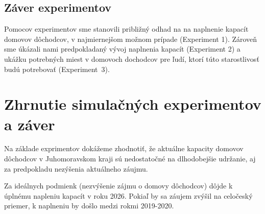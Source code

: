 \documentclass[a4paper, 11pt]{article}
\begin{document}
\subsection{Záver experimentov}
Pomocov experimentov sme stanovili približný odhad na na naplnenie kapacít domovov dôchodcov, v najmiernejšom možnom prípade (Experiment 1). Zároveň sme úkázali nami predpokladaný vývoj naplnenia kapacít (Experiment 2) a ukážku potrebných miest v domovoch dochodcov pre ľudí, ktorí túto starostlivosť budú potrebovať (Experiment~3).

\section{Zhrnutie simulačných experimentov a záver}
Na základe exprimentov dokážeme zhodnotiť, že aktuálne kapacity domovov dôchodcov v Juhomoravskom kraji sú nedostatočné na dlhodobejšie udržanie, aj za predpokladu nezýšenia aktuálneho záujmu.

Za ideálnych podmienk (nezvýšenie zájmu o domovy dôchodcov) dôjde k úplnému napleniu kapacít v roku 2026. Pokiaľ by sa záujem zvýšil na celočeský priemer, k naplneniu by došlo medzi rokmi 2019-2020. 
\end{document}
